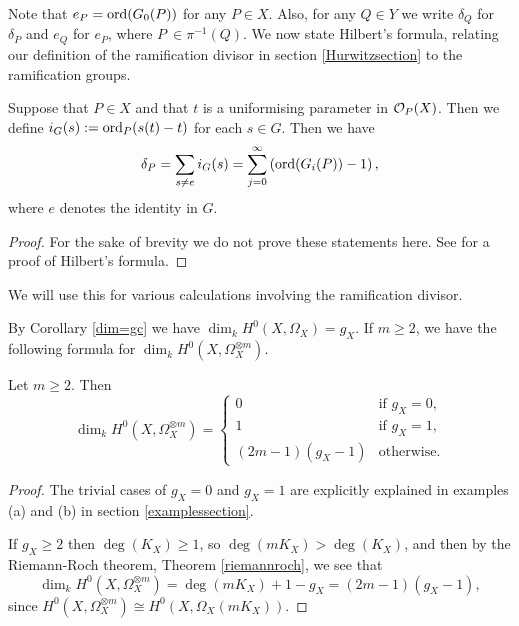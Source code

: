 Note that $e_P = \operatorname{ord} (G_0(P))$ for any $P \in X$.
Also, for any $Q \in Y$ we write $\delta_Q$ for $\delta_P$ and $e_Q$ for $e_P$, where $P\ \in \pi^{-1}(Q)$.
We now state Hilbert's formula, relating our definition of the ramification divisor in section \ref{Hurwitzsection} to the ramification groups.


    \begin{thm}\label{hilbertsformula}
    Suppose that $P\in X$ and that $t$ is a uniformising parameter in ${\cal O}_{P}(X)$.
    Then we define $i_G(s):=\operatorname{ord}_{P}(s(t)-t)$ for each $s\in G$.
    Then we have
        \begin{equation}
        \delta_P = \sum_{s\neq e}i_G(s)=\sum_{j=0}^{\infty}\left(\operatorname{ord}(G_i(P))-1\right),\label{ramdiv}
        \end{equation}
    where $e$ denotes the identity in $G$.
    \end{thm}
    \begin{proof}
    For the sake of brevity we do not prove these statements here. See \cite[Chap. IV, \S 1, Prop. 4]{localfields} for a proof of Hilbert's formula.
    \end{proof}

We will use this for various calculations involving the ramification divisor.


By Corollary \ref{dim=gc} we have $\dim_kH^0(X,\Omega_X)=g_X$.
If $m\geq 2$, we have the following formula for $\dim_kH^0(X,\Omega_X^{\otimes m})$.



    \begin{lem}\label{dim3}
    Let $m\geq 2$. Then
        \begin{equation}
        \dim_kH^0(X,\Omega_X^{\otimes m}) =
            \begin{cases}
            0 & \mbox{if } g_X=0,\\
            1 & \mbox{if } g_X=1,\\
            (2m-1)(g_X-1) & \mbox{otherwise}.
            \end{cases}
        \end{equation}
    \end{lem}
    \begin{proof}
    The trivial cases of $g_X =0$ and $g_X=1$ are explicitly explained in examples (a) and (b) in section \ref{examplessection}.
    
    If $g_X\geq 2$ then $\deg(K_X)\geq1$, so $\deg(mK_X)>\deg(K_X)$, and then by the Riemann-Roch theorem, Theorem \ref{riemannroch}, we see that 
        \[
        \dim_kH^0(X,\Omega_X^{\otimes m})=\deg(mK_X)+1-g_X=(2m-1)(g_X-1),
        \]
    since $H^0(X,\Omega_X^{\otimes m}) \cong H^0(X,\Omega_X(mK_X))$.
    \end{proof}

